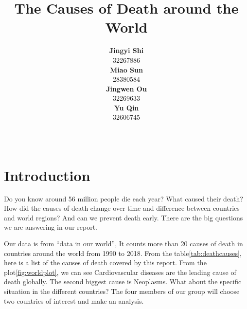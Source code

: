 \documentclass[11pt,a4paper,]{article}
\title{The Causes of Death around the World}
\author{\sf\Large\textbf{ Jingyi Shi}\\ {\sf\large 32267886\\[0.5cm]} \sf\Large\textbf{ Miao Sun}\\ {\sf\large 28380584\\[0.5cm]} \sf\Large\textbf{ Jingwen Ou}\\ {\sf\large 32269633\\[0.5cm]} \sf\Large\textbf{ Yu Qin}\\ {\sf\large 32606745\\[0.5cm]}}
\date{\sf\Date~\Month~\Year}
\makeatletter
\def\titlepage{\front{\expandafter{\@title}}{\@author}{\@organization}}
\makeatother
\begin{document}
\titlepage

\clearpage

\hypertarget{introduction}{%
\section{Introduction}\label{introduction}}

Do you know around 56 million people die each year? What caused their death? How did the causes of death change over time and difference between countries and world regions? And can we prevent death early. There are the big questions we are answering in our report.

Our data is from ``data in our world'', It counts more than 20 causes of death in countries around the world from 1990 to 2018. From the table\ref{tab:deathcauses}, here is a list of the causes of death covered by this report. From the plot\ref{fig:worldplot}, we can see Cardiovascular diseases are the leading cause of death globally. The second biggest cause is Neoplasms. What about the specific situation in the different countries? The four members of our group will choose two countries of interest and make an analysis.
\end{document}
